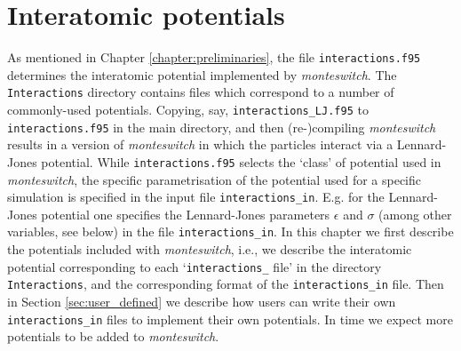 \documentclass{report}
\begin{document}
\chapter{Interatomic potentials}\label{chapter:interactions}
As mentioned in Chapter \ref{chapter:preliminaries}, the file \texttt{interactions.f95} determines the interatomic potential implemented by
\emph{monteswitch}. The \texttt{Interactions} directory contains files which correspond to a number of commonly-used potentials. Copying, say,
\texttt{interactions\_LJ.f95} to \texttt{interactions.f95} in the main directory, and then (re-)compiling \emph{monteswitch} results in a version 
of \emph{monteswitch} in which the particles interact via a Lennard-Jones potential. While \texttt{interactions.f95} selects the `class' of potential
used in \emph{monteswitch}, the specific parametrisation of the potential used for a specific simulation is specified in the input file
\texttt{interactions\_in}. E.g. for the Lennard-Jones potential one specifies the Lennard-Jones parameters $\epsilon$ and $\sigma$ (among other
variables, see below) in the file \texttt{interactions\_in}. In this chapter we first describe the potentials included with \emph{monteswitch},
i.e., we describe the interatomic potential corresponding to each `\texttt{interactions\_} file' in the directory \texttt{Interactions}, and the
corresponding format of the \texttt{interactions\_in} file. Then in Section \ref{sec:user_defined} we describe how users can write their own
\texttt{interactions\_in} files to implement their own potentials. In time we expect more potentials to be added to \emph{monteswitch}.
\end{document}

